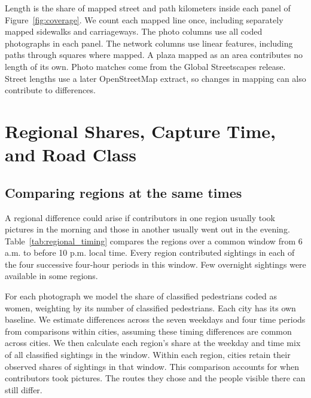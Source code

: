 \documentclass[11pt]{article}
\begin{document}
\begin{table}[!ht]
\centering\singlespacing\footnotesize
\caption{Road and path classes near camera locations and in the mapped network.}
\label{tab:network}
\begin{threeparttable}

\begin{tablenotes}[flushleft]\footnotesize
\item Length is the share of mapped street and path kilometers inside each panel of Figure~\ref{fig:coverage}. We count each mapped line once, including separately mapped sidewalks and carriageways. The photo columns use all coded photographs in each panel. The network columns use linear features, including paths through squares where mapped. A plaza mapped as an area contributes no length of its own. Photo matches come from the Global Streetscapes release. Street lengths use a later OpenStreetMap extract, so changes in mapping can also contribute to differences.
\end{tablenotes}
\end{threeparttable}
\end{table}

\clearpage
\section{Regional Shares, Capture Time, and Road Class}
\label{sec:variation}
\subsection{Comparing regions at the same times}
A regional difference could arise if contributors in one region usually took pictures in the morning and those in another usually went out in the evening. Table~\ref{tab:regional_timing} compares the regions over a common window from 6 a.m. to before 10 p.m. local time. Every region contributed sightings in each of the four successive four-hour periods in this window. Few overnight sightings were available in some regions.

For each photograph we model the share of classified pedestrians coded as women, weighting by its number of classified pedestrians. Each city has its own baseline. We estimate differences across the seven weekdays and four time periods from comparisons within cities, assuming these timing differences are common across cities. We then calculate each region's share at the weekday and time mix of all classified sightings in the window. Within each region, cities retain their observed shares of sightings in that window. This comparison accounts for when contributors took pictures. The routes they chose and the people visible there can still differ.
\end{document}
